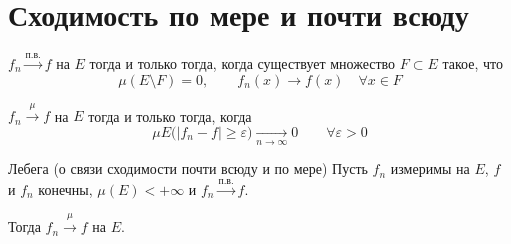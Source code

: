 \documentclass[12pt,a4paper]{article}
\begin{document}
\section{Сходимость по мере и почти всюду}

\begin{definition}
    $f_n \xrightarrow{\text{п.в.}} f$ на $E$ тогда и только тогда, когда существует множество $F \subset E$ такое, что
    \[
        \mu(E \setminus F) = 0,
        \qquad
        f_n(x) \to f(x) \quad \forall x \in F
    \]
\end{definition}

\begin{definition}
    $f_n \xrightarrow{\mu} f$ на $E$ тогда и только тогда, когда
    \[
        \mu E\bigl(|f_n-f| \geqslant \varepsilon\bigr)
        \xrightarrow[n\to\infty]{} 0
        \qquad \forall \varepsilon > 0
    \]
\end{definition}

\begin{theorem}{Лебега (о связи сходимости почти всюду и по мере)}
    Пусть $f_n$ измеримы на $E$, $f$ и $f_n$ конечны, $\mu(E)<+\infty$ и
    $f_n \xrightarrow{\text{п.в.}} f$.

    Тогда $f_n \xrightarrow{\mu} f$ на $E$.
\end{theorem}
\end{document}
